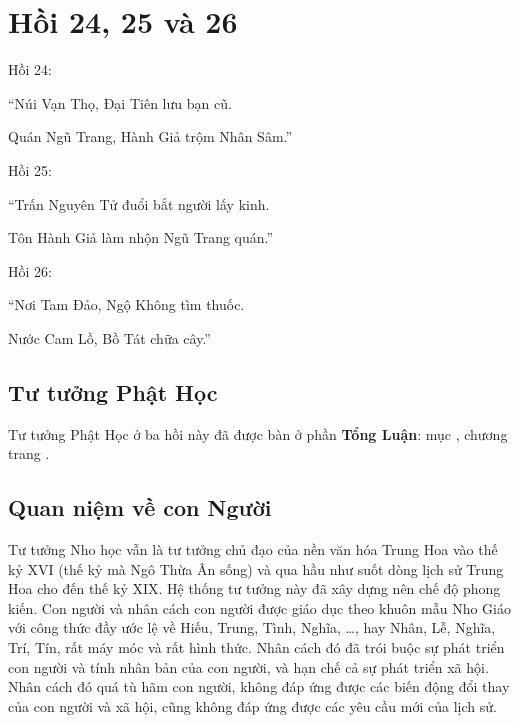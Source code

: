 \chapter{Hồi 24, 25 và 26} %
\label{cha:hoi_24_25_26}

Hồi 24:

\begin{itshape}
``Núi Vạn Thọ, Đại Tiên lưu bạn cũ.

Quán Ngũ Trang, Hành Giả trộm Nhân Sâm.''
\end{itshape}

Hồi 25:

\begin{itshape}
``Trấn Nguyên Tử đuổi bắt người lấy kinh.

Tôn Hành Giả làm nhộn Ngũ Trang quán.''
\end{itshape}

Hồi 26:

\begin{itshape}
``Nơi Tam Đảo, Ngộ Không tìm thuốc.

Nước Cam Lồ, Bồ Tát chữa cây.''
\end{itshape}

\section{Tư tưởng Phật Học} %
\label{sec:24_25_26_phat_hoc}

Tư tưởng Phật Học ở ba hồi này đã được bàn ở phần {\bf Tổng Luận}: mục , chương  trang \pageref{sec:bieu_tuong_cua_hoi_thu_26}.

\section{Quan niệm về con Người} %
\label{sec:24_25_26_con_nguoi}

Tư tưởng Nho học vẫn là tư tưởng chủ đạo của nền văn hóa Trung Hoa vào thế kỷ XVI (thế kỷ mà Ngô Thừa Ân sống) và qua hầu như suốt dòng lịch sử Trung Hoa cho đến thế kỷ XIX. Hệ thống tư tưởng này đã xây dựng nên chế độ phong kiến. Con người và nhân cách con người được giáo dục theo khuôn mẫu Nho Giáo với công thức đầy ước lệ về Hiếu, Trung, Tình, Nghĩa, \ldots, hay Nhân, Lễ, Nghĩa, Trí, Tín, rất máy móc và rất hình thức. Nhân cách đó đã trói buộc sự phát triển con người và tính nhân bản của con người, và hạn chế cả sự phát triển xã hội. Nhân cách đó quá tù hãm con người, không đáp ứng được các biến động đổi thay của con người và xã hội, cũng không đáp ứng được các yêu cầu mới của lịch sử.

